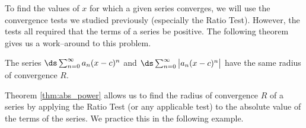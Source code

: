 To find the values of $x$ for which a given series converges, we will use the convergence tests we studied previously (especially the Ratio Test). However, the tests all required that the terms of a series be positive. The following theorem gives us a work--around to this problem.

{%
	The series $\ds \sum_{n=0}^\infty a_n(x-c)^n$ and $\ds \sum_{n=0}^\infty \big|a_n(x-c)^n\big|$ have the same radius of convergence $R$.
}
	
Theorem \ref{thm:abs_power} allows us to find the radius of convergence $R$ of a series by applying the Ratio Test (or any applicable test) to the absolute value of the terms of the series. We practice this in the following example.\\


